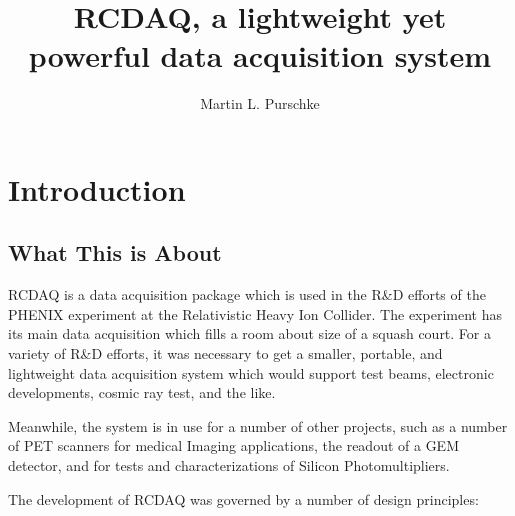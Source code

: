 \documentclass{article}[11pt]
\begin{document}
\title{RCDAQ, a lightweight yet powerful data acquisition system}
\author{Martin L. Purschke}
\maketitle


\section{Introduction}


\subsection{What This is About}

RCDAQ is a data acquisition package which is used in the R\&D efforts
of the PHENIX experiment at the Relativistic Heavy Ion Collider.  The
experiment has its main data acquisition which fills a room about
size of a squash court. For a variety of R\&D efforts, it was
necessary to get a smaller, portable, and lightweight data acquisition
system which would support test beams, electronic developments,
cosmic ray test, and the like.

Meanwhile, the system is in use for a number of other projects, such
as a number of PET scanners for medical Imaging applications, the
readout of a GEM detector, and for tests and characterizations of
Silicon Photomultipliers.


The development of RCDAQ was governed by a number of design principles:
\end{document}
